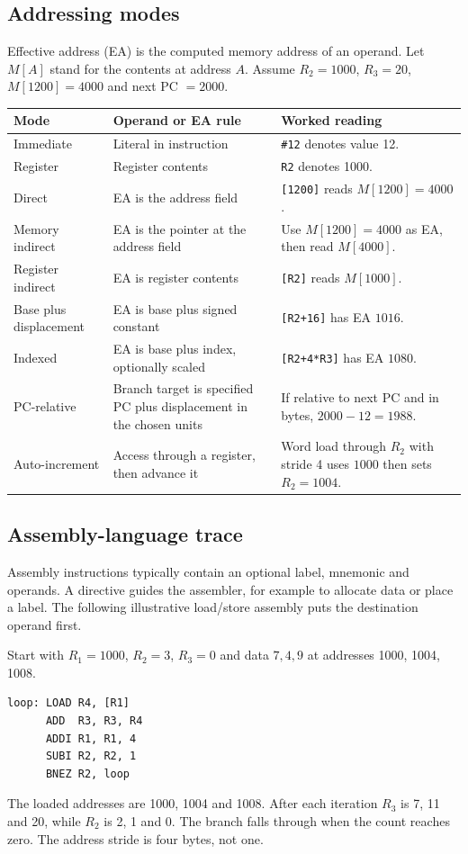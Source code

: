 \documentclass[12pt,a4paper]{article}
\begin{document}
\subsection{Addressing modes}
Effective address (EA) is the computed memory address of an operand. Let $M[A]$ stand for the contents at address $A$. Assume $R_2=1000$, $R_3=20$, $M[1200]=4000$ and next PC $=2000$.
\par\vspace{6pt}\noindent
\begin{tabularx}{\linewidth}{|B{3.0cm}|Y|Y|}\hline
Mode & Operand or EA rule & Worked reading \\ \hline
Immediate & Literal in instruction & \texttt{\#12} denotes value 12. \\ \hline
Register & Register contents & \texttt{R2} denotes 1000. \\ \hline
Direct & EA is the address field & \texttt{[1200]} reads $M[1200]=4000$. \\ \hline
Memory indirect & EA is the pointer at the address field & Use $M[1200]=4000$ as EA, then read $M[4000]$. \\ \hline
Register indirect & EA is register contents & \texttt{[R2]} reads $M[1000]$. \\ \hline
Base plus displacement & EA is base plus signed constant & \texttt{[R2+16]} has EA $1016$. \\ \hline
Indexed & EA is base plus index, optionally scaled & \texttt{[R2+4*R3]} has EA $1080$. \\ \hline
PC-relative & Branch target is specified PC plus displacement in the chosen units & If relative to next PC and in bytes, $2000-12=1988$. \\ \hline
Auto-increment & Access through a register, then advance it & Word load through $R_2$ with stride 4 uses $1000$ then sets $R_2=1004$. \\ \hline
\end{tabularx}

\subsection{Assembly-language trace}
Assembly instructions typically contain an optional label, mnemonic and operands. A directive guides the assembler, for example to allocate data or place a label. The following illustrative load/store assembly puts the destination operand first.
\begin{tcolorbox}[examplebox,title={Sum three consecutive 32-bit words}]
Start with $R_1=1000$, $R_2=3$, $R_3=0$ and data $7,4,9$ at addresses 1000, 1004, 1008.
\begin{verbatim}
loop: LOAD R4, [R1]
      ADD  R3, R3, R4
      ADDI R1, R1, 4
      SUBI R2, R2, 1
      BNEZ R2, loop
\end{verbatim}
The loaded addresses are 1000, 1004 and 1008. After each iteration $R_3$ is 7, 11 and 20, while $R_2$ is 2, 1 and 0. The branch falls through when the count reaches zero. The address stride is four bytes, not one.
\end{tcolorbox}
\end{document}
